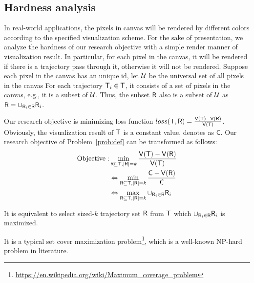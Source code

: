 \subsection{Hardness analysis}
In real-world applications, the pixels in canvas will be rendered by different colors according to the specified visualization scheme.
For the sake of presentation, we analyze the hardness of our research objective with a simple render manner of visualization result.
In particular, for each pixel in the canvas, it will be rendered if there is a trajectory pass through it, otherwise it will not be rendered.
Suppose each pixel in the canvas has an unique id, let $\mathcal{U}$ be the universal set of all pixels in the canvas
For each trajectory $\mathsf{T}_i \in \mathsf{T}$, it consists of a set of pixels in the canvas, e.g., it is a subset of $\mathcal{U}$.
Thus, the subset $\mathsf{R}$ also is a subset of $\mathcal{U}$ as $\mathsf{R} = \cup_{\mathsf{R}_i \in \mathsf{R}} \mathsf{R}_i$.

Our research objective is minimizing loss function $loss(\mathsf{T}, \mathsf{R}) =  \frac{\mathsf{V}(\mathsf{T}) - \mathsf{V}(\mathsf{R})}{\mathsf{V}(\mathsf{T})}$.
Obviously, the visualization result of $\mathsf{T}$ is a constant value, denotes as $\mathsf{C}$.
Our research objective of Problem~\ref{prob:def} can be transformed as follows:
\begin{align}\label{eqn:obj2} \nonumber
\text{Objective}: & \min_{\mathsf{R} \subseteq \mathsf{T}, |\mathsf{R}| = k}  \frac{\mathsf{V}(\mathsf{T}) - \mathsf{V}(\mathsf{R})}{\mathsf{V}(\mathsf{T})} \\ \nonumber
& \Leftrightarrow \min_{\mathsf{R} \subseteq \mathsf{T}, |\mathsf{R}| = k}  \frac{\mathsf{C} - \mathsf{V}(\mathsf{R})}{\mathsf{C}} \\ \nonumber
& \Leftrightarrow \max_{\mathsf{R} \subseteq \mathsf{T}, |\mathsf{R}| = k}  \cup_{\mathsf{R}_i \in \mathsf{R}} \mathsf{R}_i
\end{align}

It is equivalent to select sized-$k$ trajectory set $\mathsf{R}$ from $\mathsf{T}$ which $\cup_{\mathsf{R}_i \in \mathsf{R}} \mathsf{R}_i$ is maximized.

It is a typical set cover maximization problem\footnote{\url{https://en.wikipedia.org/wiki/Maximum_coverage_problem}}, which is a well-known NP-hard problem in literature.




